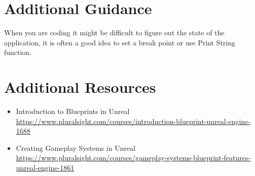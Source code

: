 \documentclass{../../../fal_assignment}
\begin{document}
\section*{Additional Guidance}
When you are coding it might be difficult to figure out the state of the application, it is often a good idea to set a break point or use Print String function.


\section*{Additional Resources}

\begin{itemize}
  \item Introduction to Blueprints in Unreal \url{https://www.pluralsight.com/courses/introduction-blueprint-unreal-engine-1688}
  \item Creating Gameplay Systems in Unreal \url{https://www.pluralsight.com/courses/gameplay-systems-blueprint-features-unreal-engine-1861}
\end{itemize}
\end{document}
